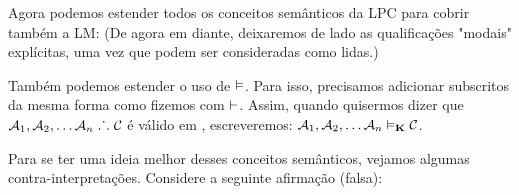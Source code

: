 Agora podemos estender todos os conceitos semânticos da LPC para cobrir também a LM:
(De agora em diante, deixaremos de lado as qualificações "modais"  explícitas, uma vez que podem ser consideradas como lidas.)


Também podemos estender o uso de $\vDash$. Para isso, precisamos adicionar subscritos da mesma forma como fizemos com $\vdash$. Assim, quando quisermos dizer que $\mathcal{A}_1,\mathcal{A}_2, \dots \mathcal{A}_n\mathrel{\ldotp\dot{}\,\ldotp}\mathcal{C}$  é válido em \mlK, escreveremos: $\mathcal{A}_1,\mathcal{A}_2, \dots \mathcal{A}_n\vDash_{\mathbf{K}}\mathcal{C}$. 

Para se ter uma ideia melhor desses conceitos semânticos, vejamos algumas contra-interpretações. Considere a seguinte afirmação (falsa):

